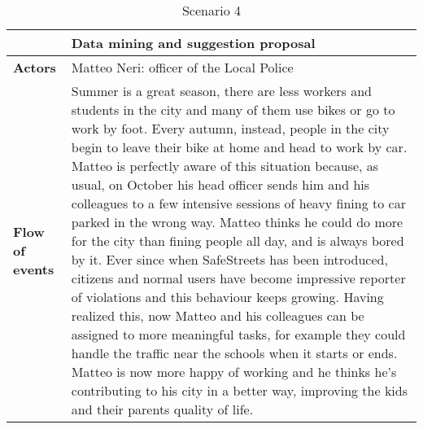 \begin{table}[!htbp]
	\centering
\begin{tabular}{lp{9cm}}
\hline
\bf\large  &\bf\large Data mining and suggestion proposal\\
\hline
\hline

\bf Actors&Matteo Neri: officer of the Local Police\\
\hline
\bf Flow of events&
Summer is a great season, there are less workers and students in the city and many of them use bikes or go to work by foot.
Every autumn, instead, people in the city begin to leave their bike at home and head to work by car. Matteo is perfectly aware of this situation because, as usual, on October his head officer sends him and his colleagues to a few intensive sessions of heavy fining to car parked in the wrong way. Matteo thinks he could do more for the city than fining people all day, and is always bored by it. Ever since when SafeStreets has been introduced, citizens and normal users have become impressive reporter of violations and this behaviour keeps growing. Having realized this, now Matteo and his colleagues can be assigned to more meaningful tasks, for example they could handle the traffic near the schools when it starts or ends. Matteo is now more happy of working and he thinks he's contributing to his city in a better way, improving the kids and their parents quality of life.
\end{tabular}
\caption{Scenario 4} 
\label{tab:scenariofour}
\end{table}